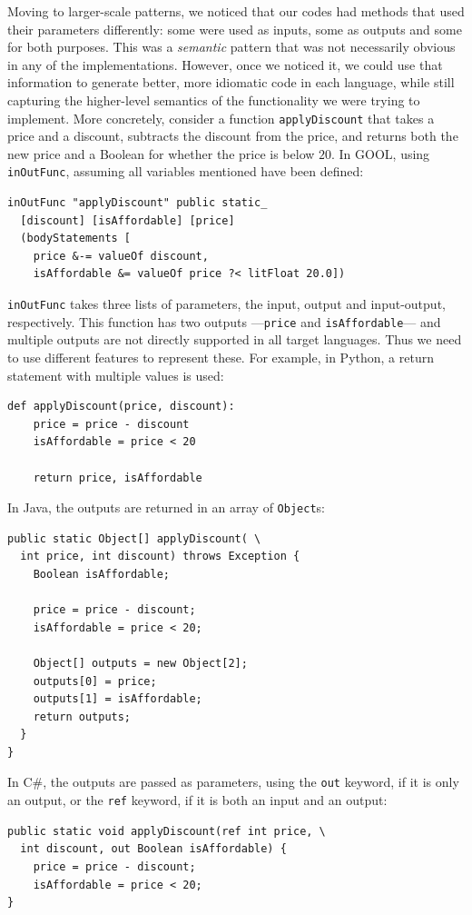 \documentclass[sigplan,review,prologue,dvipsnames]{acmart}
\newcommand{\Csharp}{C\#}
\begin{document}
Moving to larger-scale patterns, we noticed that our codes had methods that
used their parameters differently: some were used as inputs, some as outputs
and some for both purposes.  This was a \emph{semantic} pattern that was
not necessarily obvious in any of the implementations. However, once we noticed 
it, we could use that information to generate better, more idiomatic code in
each language, while still capturing the higher-level semantics of the
functionality we were trying to implement.  More concretely, consider a
function \verb|applyDiscount| that takes a price and a discount, subtracts the
discount from the price, and returns both the new price and a Boolean for
whether the price is below $20$. In GOOL, using \verb|inOutFunc|, assuming
all variables mentioned have been defined:
\begin{lstlisting}
inOutFunc "applyDiscount" public static_
  [discount] [isAffordable] [price]
  (bodyStatements [
    price &-= valueOf discount,
    isAffordable &= valueOf price ?< litFloat 20.0])
\end{lstlisting}
\verb|inOutFunc| takes three lists of parameters, the input, output and
input-output, respectively.  This function has two outputs
---\verb|price| and \verb|isAffordable|--- and multiple outputs are
not directly supported in all target languages.  Thus we need to use
different features to represent these.  For example, in Python, a
return statement with multiple values is used:
\begin{lstlisting}
def applyDiscount(price, discount):
    price = price - discount
    isAffordable = price < 20

    return price, isAffordable
\end{lstlisting}
In Java, the outputs are returned in an array of \verb|Object|s:
\begin{lstlisting}
public static Object[] applyDiscount( \
  int price, int discount) throws Exception {
    Boolean isAffordable;

    price = price - discount;
    isAffordable = price < 20;

    Object[] outputs = new Object[2];
    outputs[0] = price;
    outputs[1] = isAffordable;
    return outputs;
  }
}
\end{lstlisting}
In \Csharp, the outputs are passed as parameters, using the \verb|out| keyword, if
it is only an output, or the \verb|ref| keyword, if it is both an input and an
output:
\begin{lstlisting}
public static void applyDiscount(ref int price, \
  int discount, out Boolean isAffordable) {
    price = price - discount;
    isAffordable = price < 20;
}
\end{lstlisting}
\end{document}
